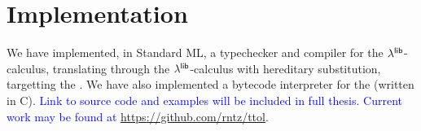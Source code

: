 \documentclass[11pt]{article}
\newcommand{\bscolor}{blue}
\newcommand{\bs}[1]{\textcolor{\bscolor}{#1}}
\begin{document}
\section{Implementation}

We have implemented, in Standard ML, a typechecker and compiler for the
$\lambda^{\textsf{lib}}$-calculus, translating through the $\lambda^{\textsf{lib}}$-calculus with hereditary
substitution, targetting the \camlib{}. We have also implemented a bytecode
interpreter for the \camlib{} (written in C). \bs{Link to source code and
  examples will be included in full thesis. Current work may be found at
  \url{https://github.com/rntz/ttol}.}




\end{document}
